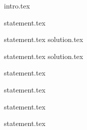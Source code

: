 {intro.tex}

{statement.tex}

{statement.tex}
{solution.tex}

{statement.tex}
{solution.tex}

{statement.tex}

{statement.tex}

{statement.tex}

{statement.tex}